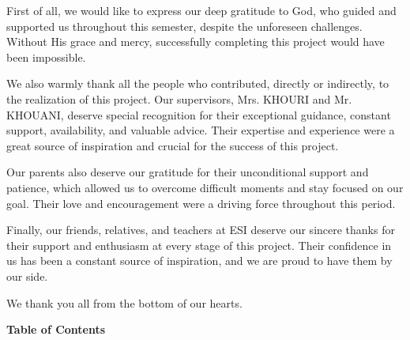 \documentclass[12pt]{article}
\begin{document}
First of all, we would like to express our deep gratitude to God, who guided and supported us throughout this semester, despite the unforeseen challenges. Without His grace and mercy, successfully completing this project would have been impossible.

\vspace{0.5cm}

We also warmly thank all the people who contributed, directly or indirectly, to the realization of this project. Our supervisors, Mrs. KHOURI and Mr. KHOUANI, deserve special recognition for their exceptional guidance, constant support, availability, and valuable advice. Their expertise and experience were a great source of inspiration and crucial for the success of this project.

\vspace{0.5cm}

Our parents also deserve our gratitude for their unconditional support and patience, which allowed us to overcome difficult moments and stay focused on our goal. Their love and encouragement were a driving force throughout this period.

\vspace{0.5cm}

Finally, our friends, relatives, and teachers at ESI deserve our sincere thanks for their support and enthusiasm at every stage of this project. Their confidence in us has been a constant source of inspiration, and we are proud to have them by our side.

\vspace{0.5cm}

We thank you all from the bottom of our hearts.

\newpage
\begin{center}
    \textbf{\Huge Table of Contents}
\end{center}

\tableofcontents

\vspace{1cm}
\end{document}
